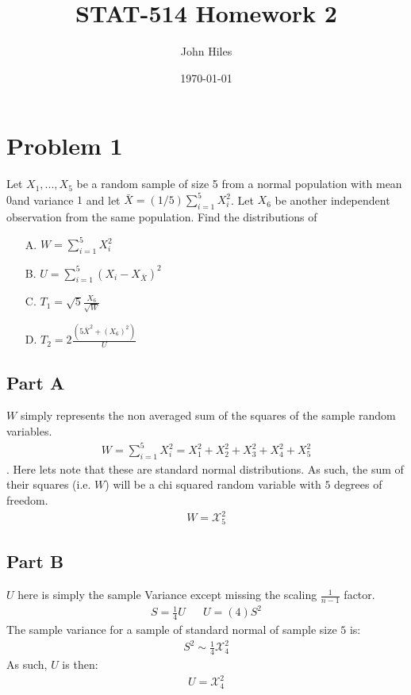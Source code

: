 \documentclass{article}
\title{STAT-514 Homework 2}
\author{John Hiles}
\date\today
\begin{document}
\maketitle %

\section*{Problem 1}
Let $X_1,...,X_5$ be a random sample of size 5 from a normal population with mean $0 $and variance $1$ and let $\bar{X}=(1/5)\sum_{i=1}^{5}X_i^2$. Let $X_6$ be another independent observation from the same population. Find the distributions of
\begin{enumerate}
\item[A.] $W=\sum_{i=1}^5 X_i^2$
\item[B.] $U=\sum_{i=1}^5 (X_i-X_{\bar{X}})^2$
\item[C.] $T_1 = \sqrt{5} \frac{X_6}{\sqrt{W}}$
\item[D.] $T_2 = 2\frac{(5\bar{X}^2+(X_6)^2)}{U}$

\end{enumerate}
\subsection*{Part A}
$W$ simply represents the non averaged sum of the squares of the sample random variables.
\begin{align*}
W=\sum_{i=1}^5 X_i^2 = X_1^2+X_2^2+X_3^2+X_4^2+X_5^2
\end{align*}.
Here lets note that these are standard normal distributions. As such, the sum of their squares (i.e. $W$) will be a chi squared random variable with $5$ degrees of freedom.
\begin{align*}
W = \mathcal{X}_5^2
\end{align*}
\subsection*{Part B}
$U$ here is simply the sample Variance except missing the scaling $\frac{1}{n-1}$ factor.
\begin{align*}
S = \frac{1}{4} U && U = (4)S^2
\end{align*}
The sample variance for a sample of standard normal of sample size $5$ is:
\begin{align*}
S^2 \sim \frac{1}{4} \mathcal{X}_{4}^{2}
\end{align*}
As such, $U$ is then:
\begin{align*}
\boxed{ U = \mathcal{X}_{4}^{2} }
\end{align*}
\end{document}
